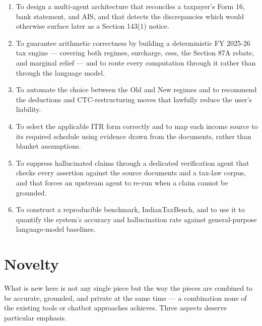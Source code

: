 \begin{enumerate}
    \item To design a multi-agent architecture that reconciles a taxpayer's
          Form 16, bank statement, and AIS, and that detects the discrepancies
          which would otherwise surface later as a Section 143(1) notice.
    \item To guarantee arithmetic correctness by building a deterministic
          FY 2025-26 tax engine --- covering both regimes, surcharge, cess, the
          Section 87A rebate, and marginal relief --- and to route every
          computation through it rather than through the language model.
    \item To automate the choice between the Old and New regimes and to
          recommend the deductions and CTC-restructuring moves that lawfully
          reduce the user's liability.
    \item To select the applicable ITR form correctly and to map each income
          source to its required schedule using evidence drawn from the
          documents, rather than blanket assumptions.
    \item To suppress hallucinated claims through a dedicated verification agent
          that checks every assertion against the source documents and a
          tax-law corpus, and that forces an upstream agent to re-run when a
          claim cannot be grounded.
    \item To construct a reproducible benchmark, IndianTaxBench, and to use it
          to quantify the system's accuracy and hallucination rate against
          general-purpose language-model baselines.
\end{enumerate}

\section{Novelty}
\label{sec:novelty}

What is new here is not any single piece but the way the pieces are combined to
be accurate, grounded, and private at the same time --- a combination none of
the existing tools or chatbot approaches achieves. Three aspects deserve
particular emphasis.

